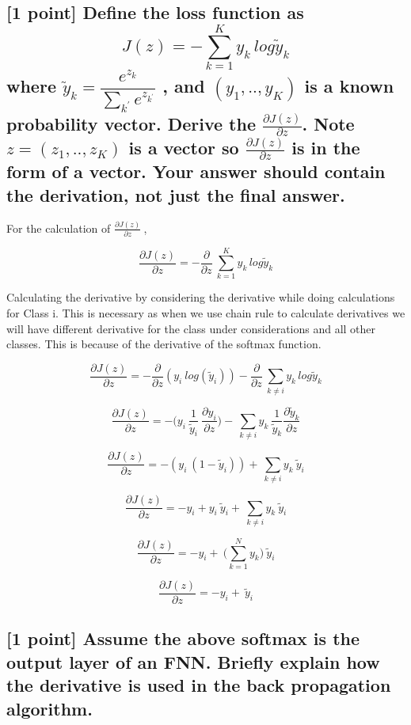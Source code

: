 \subsection{ [1 point] Define the loss function as 
$$ J(z) = -\sum_{k=1}^{K}y_k \, log \widetilde{y}_k $$ 
where  $\widetilde{y}_k = \dfrac{e^{z_k}}{\sum_{k^{'}}^{} e^{z_{k^{'}}}}$ , and $(y_1,.., y_K)$ is a known probability vector. Derive the  $ \frac{\partial J(z)}{\partial z} $.
Note  $z = (z_1,.., z_K)$ is a vector so  $ \frac{\partial J(z)}{\partial z} $ is in the form of a vector. Your answer should contain the derivation, not just the final answer.}

For the calculation of $ \frac{\partial J(z)}{\partial z} \ $, 

$$\frac{\partial J(z)}{\partial z} =  -\frac{\partial}{\partial z} \ \sum_{k=1}^{K}y_k \, log \widetilde{y}_k$$

Calculating the derivative by considering the derivative while doing calculations for Class i. 
This is necessary as when we use chain rule to calculate derivatives we will have different derivative for the class under considerations and all other classes. This is because of the derivative of the softmax function.  

$$\frac{\partial J(z)}{\partial z} = -\frac{\partial}{\partial z}(y_i \ log(\widetilde{y}_i)) -\frac{\partial}{\partial z} \ \sum_{k\neq i}y_k \, log \widetilde{y}_k$$

$$\frac{\partial J(z)}{\partial z} = -\Big(y_i \ \frac{1}{\widetilde{y}_i} \ \frac{\partial y_i}{\partial z}\Big) - \ \sum_{k\neq i}y_k \ \frac{1}{\widetilde{y}_k} \frac{\partial \widetilde{y}_k}{\partial z}$$



$$\frac{\partial J(z)}{\partial z} = -(y_i \ (1-\widetilde{y}_i)) + \ \sum_{k\neq i}y_k \ \widetilde{y}_i$$

$$\frac{\partial J(z)}{\partial z} = -y_i + y_i \ \widetilde{y}_i + \ \sum_{k\neq i}y_k \ \widetilde{y}_i$$


$$\frac{\partial J(z)}{\partial z} = -y_i + \ \Big(\sum_{k=1}^{N}y_k\Big) \ \widetilde{y}_i$$


$$\frac{\partial J(z)}{\partial z} = -y_i + \ \widetilde{y}_i$$

\subsection{ [1 point] Assume the above softmax is the output layer of an FNN. Briefly explain
how the derivative is used in the back propagation algorithm.}

